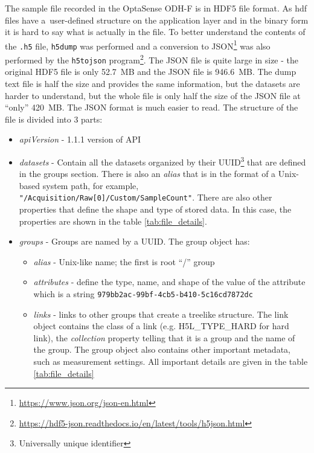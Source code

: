 The sample file recorded in the OptaSense ODH-F is in HDF5 file format. As \ac{hdf} files have a~user-defined structure on the application layer and in the binary form it is hard to say what is actually in the file. To better understand the contents of the \verb|.h5| file, \verb|h5dump| was performed and a conversion to JSON\footnote{\url{https://www.json.org/json-en.html}} was also performed by the \verb|h5tojson| program\footnote{\url{https://hdf5-json.readthedocs.io/en/latest/tools/h5json.html}}. The JSON file is quite large in size - the original HDF5 file is only \qty{52,7}{MB} and the JSON file is \qty{946,6}{MB}. The dump text file is half the size and provides the same information, but the datasets are harder to understand, but the whole file is only half the size of the JSON file at ``only'' \qty{420}{MB}. The JSON format is much easier to read. The structure of the file is divided into 3 parts:

\begin{itemize}
    \item \textit{apiVersion} - 1.1.1 version of API
    \item \textit{datasets} - Contain all the datasets organized by their UUID\footnote{Universally unique identifier} that are defined in the groups section. There is also an \textit{alias} that is in the format of a Unix-based system path, for example, \verb|"/Acquisition/Raw[0]/Custom/SampleCount"|. There are also other properties that define the shape and type of stored data. In this case, the properties are shown in the table \ref{tab:file_details}.
    \item \textit{groups} - Groups are named by a UUID. The group object has:
        \begin{itemize}
            \item \textit{alias} - Unix-like name; the first is root ``/'' group
            \item \textit{attributes} - define the type, name, and shape of the value of the attribute which is a string \verb|979bb2ac-99bf-4cb5-b410-5c16cd7872dc|
            \item \textit{links} - links to other groups that create a treelike structure. The link object contains the class of a link (e.g. H5L\_TYPE\_HARD for hard link), the \textit{collection} property telling that it is a group and the name of the group. The group object also contains other important metadata, such as measurement settings. All important details are given in the table \ref{tab:file_details}
        \end{itemize}
\end{itemize}


